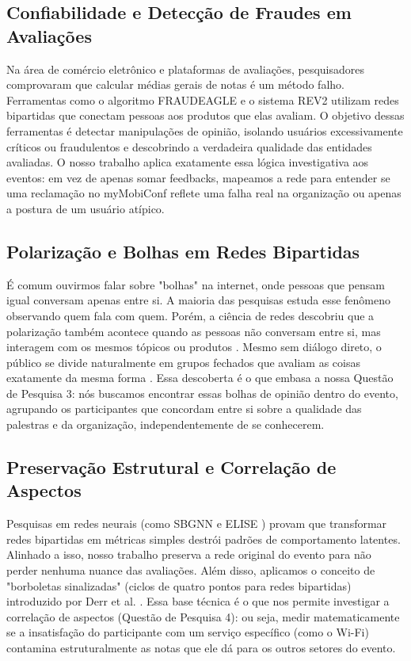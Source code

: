 \documentclass[sigconf]{webmedia}
\begin{document}
\subsection{Confiabilidade e Detecção de Fraudes em Avaliações}
Na área de comércio eletrônico e plataformas de avaliações, pesquisadores comprovaram que calcular médias gerais de notas é um método falho. Ferramentas como o algoritmo FRAUDEAGLE \cite{akoglu2013} e o sistema REV2 \cite{kumar2018} utilizam redes bipartidas que conectam pessoas aos produtos que elas avaliam. O objetivo dessas ferramentas é detectar manipulações de opinião, isolando usuários excessivamente críticos ou fraudulentos e descobrindo a verdadeira qualidade das entidades avaliadas. O nosso trabalho aplica exatamente essa lógica investigativa aos eventos: em vez de apenas somar feedbacks, mapeamos a rede para entender se uma reclamação no myMobiConf reflete uma falha real na organização ou apenas a postura de um usuário atípico.

\subsection{Polarização e Bolhas em Redes Bipartidas}
É comum ouvirmos falar sobre "bolhas" na internet, onde pessoas que pensam igual conversam apenas entre si. A maioria das pesquisas estuda esse fenômeno observando quem fala com quem. Porém, a ciência de redes descobriu que a polarização também acontece quando as pessoas não conversam entre si, mas interagem com os mesmos tópicos ou produtos \cite{alsinet2023}. Mesmo sem diálogo direto, o público se divide naturalmente em grupos fechados que avaliam as coisas exatamente da mesma forma \cite{candellone2024}. Essa descoberta é o que embasa a nossa Questão de Pesquisa 3: nós buscamos encontrar essas bolhas de opinião dentro do evento, agrupando os participantes que concordam entre si sobre a qualidade das palestras e da organização, independentemente de se conhecerem.

\subsection{Preservação Estrutural e Correlação de Aspectos}
Pesquisas em redes neurais (como SBGNN \cite{huang2021} e ELISE \cite{gu2024}) provam que transformar redes bipartidas em métricas simples destrói padrões de comportamento latentes. Alinhado a isso, nosso trabalho preserva a rede original do evento para não perder nenhuma nuance das avaliações. Além disso, aplicamos o conceito de "borboletas sinalizadas" (ciclos de quatro pontos para redes bipartidas) introduzido por Derr et al. \cite{derr2019}. Essa base técnica é o que nos permite investigar a correlação de aspectos (Questão de Pesquisa 4): ou seja, medir matematicamente se a insatisfação do participante com um serviço específico (como o Wi-Fi) contamina estruturalmente as notas que ele dá para os outros setores do evento.
\end{document}
